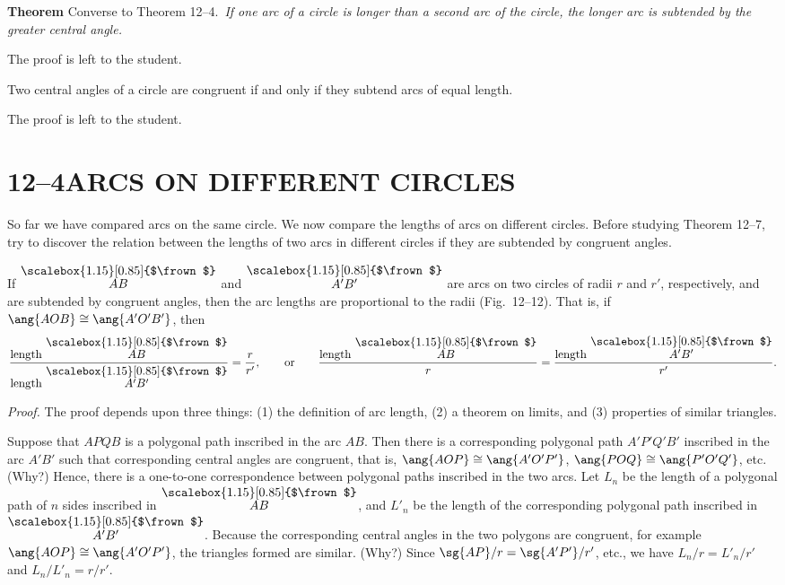\documentclass[11pt]{book}
\theoremstyle{bkplain}
\theoremstyle{XIplainnote}
\theoremstyle{bkplain}
\newcommand{\XIIarc}[1]{\overset{\raisebox{-0.25ex}{\scalebox{1.15}[0.85]{$\frown$}}}{#1}}
\theoremstyle{bkplain}
\begin{document}
\par\medskip\noindent\textbf{Theorem \thetheorem} Converse to Theorem 12--4.\
\emph{If one arc of a circle is longer than a second arc of the circle, the
longer arc is subtended by the greater central angle.}\par\medskip

The proof is left to the student.

\begin{theorem}
Two central angles of a circle are congruent if and only if they subtend arcs of
equal length.
\end{theorem}

The proof is left to the student.

\section*{12--4\quad ARCS ON DIFFERENT CIRCLES}

So far we have compared arcs on the same circle. We now compare the lengths of
arcs on different circles. Before studying Theorem 12--7, try to discover the
relation between the lengths of two arcs in different circles if they are
subtended by congruent angles.

\begin{theorem}
If $\XIIarc{AB}$ and $\XIIarc{A'B'}$ are arcs on two circles of radii $r$ and
$r'$, respectively, and are subtended by congruent angles, then the arc lengths
are proportional to the radii (Fig.~12--12). That is, if
$\ang{AOB} \cong \ang{A'O'B'}$, then
\[
\frac{\text{length } \XIIarc{AB}}{\text{length } \XIIarc{A'B'}} =
\frac{r}{r'}, \qquad \text{or} \qquad
\frac{\text{length } \XIIarc{AB}}{r} =
\frac{\text{length } \XIIarc{A'B'}}{r'}.
\]
\end{theorem}

\noindent\emph{Proof.} The proof depends upon three things: (1) the definition
of arc length, (2) a theorem on limits, and (3) properties of similar triangles.

Suppose that $APQB$ is a polygonal path inscribed in the arc $AB$. Then there is
a corresponding polygonal path $A'P'Q'B'$ inscribed in the arc $A'B'$ such that
corresponding central angles are congruent, that is,
$\ang{AOP} \cong \ang{A'O'P'}$, $\ang{POQ} \cong \ang{P'O'Q'}$, etc. (Why?)
Hence, there is a one-to-one correspondence between polygonal paths inscribed in
the two arcs. Let $L_n$ be the length of a polygonal path of $n$ sides inscribed
in $\XIIarc{AB}$, and $L'_n$ be the length of the corresponding polygonal path
inscribed in $\XIIarc{A'B'}$. Because the corresponding central angles in the
two polygons are congruent, for example $\ang{AOP} \cong \ang{A'O'P'}$, the
triangles formed are similar. (Why?) Since $\sg{AP}/r = \sg{A'P'}/r'$, etc., we
have $L_n/r = L'_n/r'$ and $L_n/L'_n = r/r'$.
\end{document}
